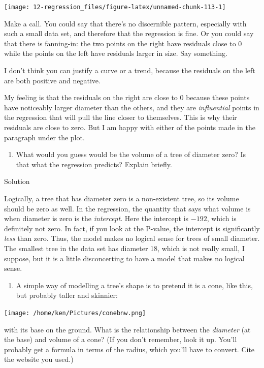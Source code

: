 \documentclass[]{tufte-book}
\providecommand{\tightlist}{%
  \setlength{\itemsep}{0pt}\setlength{\parskip}{0pt}}
\theoremstyle{definition}
\theoremstyle{definition}
\theoremstyle{definition}
\theoremstyle{remark}
\begin{document}
\texttt{[image: 12-regression\_files/figure-latex/unnamed-chunk-113-1]}

Make a call. You could say that there's no discernible pattern,
especially with such a small data set, and therefore that the regression
is fine. Or you could say that there is fanning-in: the two points on
the right have residuals close to 0 while the points on the left have
residuals larger in size. Say something.

I don't think you can justify a curve or a trend, because the residuals
on the left are both positive and negative.

My feeling is that the residuals on the right are close to 0 because
these points have noticeably larger diameter than the others, and they
are \emph{influential} points in the regression that will pull the line
closer to themselves. This is why their residuals are close to zero. But
I am happy with either of the points made in the paragraph under the
plot.

\begin{enumerate}
\def\labelenumi{(\alph{enumi})}
\setcounter{enumi}{5}
\tightlist
\item
  What would you guess would be the volume of a tree of diameter zero?
  Is that what the regression predicts? Explain briefly.
\end{enumerate}

Solution

Logically, a tree that has diameter zero is a non-existent tree, so its
volume should be zero as well. In the regression, the quantity that says
what volume is when diameter is zero is the \emph{intercept}. Here the
intercept is \(-192\), which is definitely not zero. In fact, if you
look at the P-value, the intercept is significantly \emph{less} than
zero. Thus, the model makes no logical sense for trees of small
diameter. The smallest tree in the data set has diameter 18, which is
not really small, I suppose, but it is a little disconcerting to have a
model that makes no logical sense.

\begin{enumerate}
\def\labelenumi{(\alph{enumi})}
\setcounter{enumi}{6}
\tightlist
\item
  A simple way of modelling a tree's shape is to pretend it is a cone,
  like this, but probably taller and skinnier:
\end{enumerate}

\texttt{[image: /home/ken/Pictures/conebnw.png]}

with its base on the ground. What is the relationship between the
\emph{diameter} (at the base) and volume of a cone? (If you don't
remember, look it up. You'll probably get a formula in terms of the
radius, which you'll have to convert. Cite the website you used.)
\end{document}
